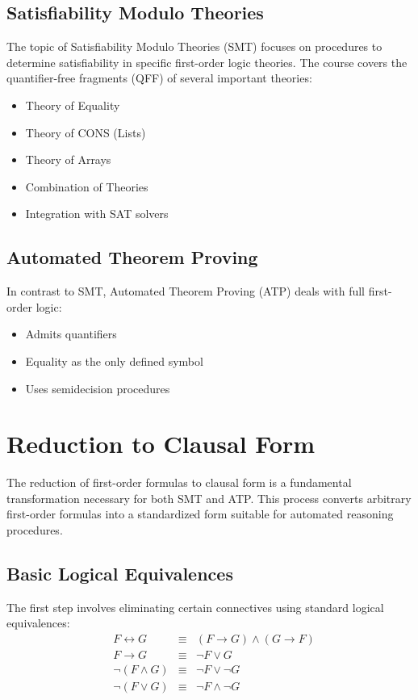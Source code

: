 \documentclass[a4paper]{article}
\theoremstyle{definition}
\begin{document}
\subsection{Satisfiability Modulo Theories}
The topic of Satisfiability Modulo Theories (SMT) focuses on procedures to determine satisfiability in specific first-order 
logic theories. The course covers the quantifier-free fragments (QFF) of several important theories:
\begin{itemize}
	\item Theory of Equality 
	\item Theory of CONS (Lists)
	\item Theory of Arrays
	\item Combination of Theories
	\item Integration with SAT solvers
\end{itemize}
\subsection{Automated Theorem Proving}
In contrast to SMT, Automated Theorem Proving (ATP) deals with full first-order logic:
\begin{itemize}
	\item Admits quantifiers 
	\item Equality as the only defined symbol 
	\item Uses semidecision procedures
\end{itemize}
\section{Reduction to Clausal Form}
The reduction of first-order formulas to clausal form is a fundamental transformation necessary for both SMT and ATP.
This process converts arbitrary first-order formulas into a standardized form suitable for automated reasoning procedures.
\subsection{Basic Logical Equivalences}
The first step involves eliminating certain connectives using standard logical equivalences:
\begin{align*}
	& F \leftrightarrow G & \equiv & (F \rightarrow G) \wedge (G \rightarrow F) \\
	& F \rightarrow G & \equiv & \lnot F \vee G \\
	& \lnot (F \wedge G) & \equiv & \lnot F \vee \lnot G \\
	& \lnot (F \vee G) & \equiv & \lnot F \wedge \lnot G \\
\end{align*}
\end{document}
